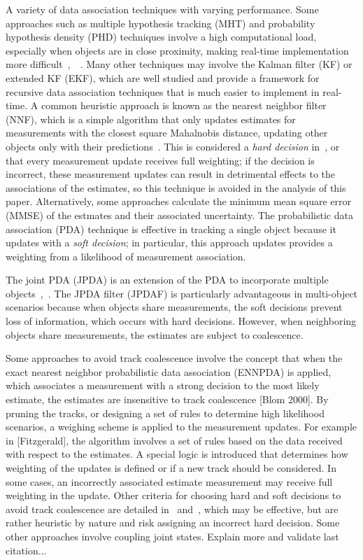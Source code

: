 \documentclass[letterpaper, 10pt, conference]{ieeeconf}
\begin{document}
A variety of data association techniques with varying performance.
Some approaches such as multiple hypothesis tracking (MHT) and probability hypothesis density (PHD) techniques involve a high computational load, especially when objects are in close proximity, making real-time implementation more difficult~\cite{MHT1},~\cite{PHD1}~\cite{PHD2}.
Many other techniques may involve the Kalman filter (KF) or extended KF (EKF), which are well studied and provide a framework for recursive data association techniques that is much easier to implement in real-time.
A common heuristic approach is known as the nearest neighbor filter (NNF), which is a simple algorithm that only updates estimates for measurements with the closest square Mahalnobis distance, updating other objects only with their predictions~\cite{NN2}.
This is considered a \emph{hard decision} in~\cite{JPDAF1}, or that every measurement update receives full weighting; if the decision is incorrect, these measurement updates can result in detrimental effects to the associations of the estimates, so this technique is avoided in the analysis of this paper.
Alternatively, some approaches calculate the minimum mean square error (MMSE) of the estmates and their associated uncertainty.
The probabilistic data association (PDA) technique is effective in tracking a single object because it updates with a \emph{soft decision}; in particular, this approach updates provides a weighting from a likelihood of measurement association.

The joint PDA (JPDA) is an extension of the PDA to incorporate multiple objects~\cite{JPDAF1},~\cite{TrackDataAssoc}.
The JPDA filter (JPDAF) is particularly advantageous in multi-object scenarios because when objects share measurements, the soft decisions prevent loss of information, which occurs with hard decisions.
However, when neighboring objects share measurements, the estimates are subject to coalescence.

Some approaches to avoid track coalescence involve the concept that when the exact nearest neighbor probabilistic data association (ENNPDA) is applied, which associates a measurement with a strong decision to the most likely estimate, the estimates are insensitive to track coalescence [Blom 2000].
By pruning the tracks, or designing a set of rules to determine high likelihood scenarios, a weighing scheme is applied to the measurement updates.
For example in [Fitzgerald], the algorithm involves a set of rules based on the data received with respect to the estimates.
A special logic is introduced that determines how weighting of the updates is defined or if a new track should be considered.
In some cases, an incorrectly associated estimate measurement may receive full weighting in the update.
Other criteria for choosing hard and soft decisions to avoid track coalescence are detailed in~\cite{Coal_d} and~\cite{Coal_e}, which may be effective, but are rather heuristic by nature and risk assigning an incorrect hard decision.
Some other approaches involve coupling joint states. Explain more and validate last citation...
\end{document}
